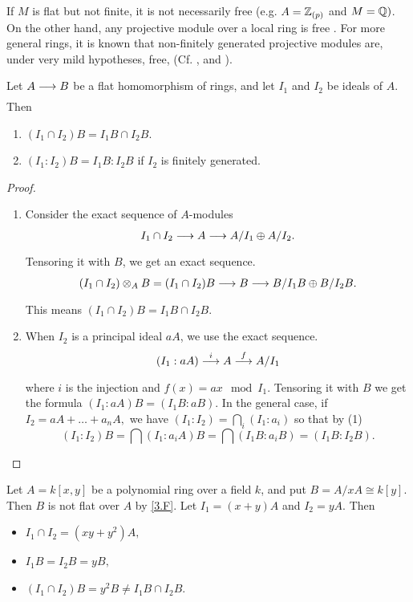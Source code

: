 \documentclass[../main]{subfiles}
\begin{document}
\begin{remark*} If $M$ is flat but not finite, it is not necessarily free (e.g. $A=\mathbb{Z}_{(p)}$ and $M=\mathbb{Q})$. On the other hand, any projective module over a local ring is free \cite{kaplansky1958projective}. For more general rings, it is known that non-finitely generated projective modules are, under very mild hypotheses, free, (Cf. \cite{bass1963big}, and \cite{hinohara1963projective}). 
\end{remark*}

\newparagraph Let $A \varrightarrow{} B$ be a flat homomorphism of rings, and let $I_1$ and $I_2$ be ideals of $A.$ Then 
\begin{enumerate} [label=(\arabic*)]
    \item $(I_1 \cap I_2)B = I_1B \cap I_2B$.
    \item $(I_1 : I_2)B = I_1B : I_2B $ if $I_2$ is finitely generated.
\end{enumerate}

\begin{proof} 
    \begin{enumerate} [label=(\arabic*)]
        \item Consider the exact sequence of $A$-modules 
            \[
                I_1 \cap I_2 \varrightarrow{} A \varrightarrow{} A/ I_1 \oplus A/ I_2.
            \] 
            Tensoring it with $B$, we get an exact sequence. 
            \[
                (I_1 \cap I_2) \otimes_A B = (I_1\cap I_2)B \varrightarrow{} B \varrightarrow{} B/ I_1B \oplus B/ I_2B.
            \] 
            This means $(I_1 \cap I_2)B = I_1B \cap I_2B.$
        \item When $I_2$ is a principal ideal $aA$, we use the exact sequence. 
            \[
                (I_1:aA) \varrightarrow{i} A \varrightarrow{f} A/ I_1
            \] 
            where $i$ is the injection and $f(x) = ax \mod I_1$. Tensoring it with $B$ we get the formula $(I_1:aA)B = (I_1B:aB)$. In the general case, if $I_2=aA+ \ldots + a_nA,$ we have $(I_1:I_2) = \bigcap_i (I_1:a_i)$ so that by (1)
            \[
                (I_1 : I_2)B = \bigcap (I_1:a_iA)B = \bigcap (I_1B:a_iB) = (I_1B:I_2B).
            \] 
    \end{enumerate}
\end{proof}

\begin{parexample}     
    Let $A = k[x,y]$ be a polynomial ring over a field $k$, and put $B = A/ xA \cong k[y]$. Then $B$ is not flat over $A$ by \ref{3.F}. Let $I_1 = (x+y)A$ and $I_2=yA$. Then 
    \begin{itemize}
        \item  $I_1\cap I_2 = (xy + y^{2})A,$
        \item  $I_1B = I_2B = yB,$
        \item $(I_1 \cap I_2)B = y^{2}B \neq I_1B \cap I_2B.$
    \end{itemize}
\end{parexample}
\end{document}
